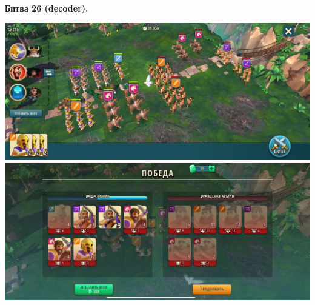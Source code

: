 \newpage
\begin{center}
	\hypertarget{fight26}{\textbf{Битва 26 (decoder).}}
\end{center}
\noindent\includegraphics[width=\linewidth]{./parts/media/TreasureHunt/26/decoder/photo_2022-04-06_18-11-14.jpg} \newline
\noindent\includegraphics[width=\linewidth]{./parts/media/TreasureHunt/26/decoder/photo_2022-04-06_18-11-23.jpg} \newline


